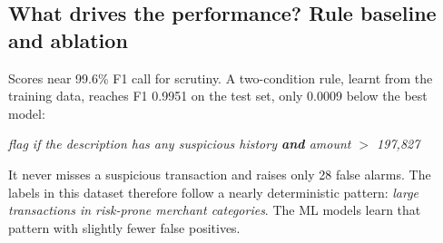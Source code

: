 \documentclass[12pt,a4paper]{article}
\begin{document}
\begin{table}[H]
\centering\small
\begin{minipage}{0.54\textwidth}\centering
\caption{5-fold CV on the training set (mean $\pm$ sd).}\label{tab:cv}
\end{minipage}\hfill
\begin{minipage}{0.43\textwidth}\centering
\caption{McNemar tests vs Decision Tree.}\label{tab:mcnemar}
\end{minipage}
\end{table}

\subsection{What drives the performance? Rule baseline and ablation}\label{sec:ablation}
Scores near 99.6\% F1 call for scrutiny. A two-condition rule, learnt from the training data, reaches F1 0.9951 on the test set, only 0.0009 below the best model:
\begin{center}
\emph{flag if the description has any suspicious history \textbf{and} amount $>$ 197{,}827}
\end{center}
It never misses a suspicious transaction and raises only 28 false alarms. The labels in this dataset therefore follow a nearly deterministic pattern: \emph{large transactions in risk-prone merchant categories}. The ML models learn that pattern with slightly fewer false positives.
\end{document}
